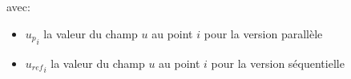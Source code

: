 avec:
\begin{itemize}
\item ${u_p}_i$ la valeur du champ $u$ au point $i$ pour la version parallèle
\item ${u_{ref}}_i$ la valeur du champ $u$ au point $i$ pour la version séquentielle
\end{itemize}
%    
